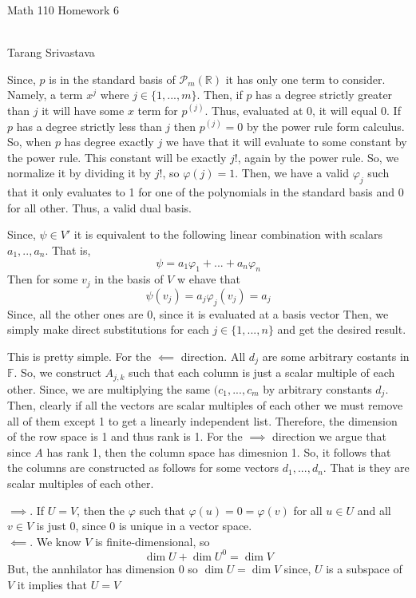 \documentclass[10pt, twocolumn]{article}
\author{Tarang Srivastava}
\newcommand{\R}{\mathbb{R}}
\newcommand{\F}{\mathbb{F}}
\newcommand{\poly}[2]{\mathcal{P}_{#1}\left(#2\right)}
\newcommand{\annhilator}[1]{#1^{0}}
\newcommand{\makechaptertitle}[1]{
\begin{center}
	\begin{large}
		#1
	\end{large}
	\begin{small}
		\\Tarang Srivastava
	\end{small}
\end{center}
}
\begin{document}
	
\makechaptertitle{Math 110 Homework 6}

\begin{q}[7]
    Since, $ p $ is in the standard basis of $ \poly{m}{\R} $ it has only one term to consider.
    Namely, a term $ x^j $ where $ j \in \{1, ..., m\} $. 
    Then, if $ p $ has a degree strictly greater than $ j $ it will have some $ x $ term for $ p^(j) $. 
    Thus, evaluated at 0, it will equal 0. 
    If $ p $ has a degree strictly less than $ j $ then $ p^{(j)} = 0 $ by the power rule form calculus.
    So, when $ p $ has degree exactly $ j $ we have that it will evaluate to some constant by the power rule. 
    This constant will be exactly $ j! $, again by the power rule. 
    So, we normalize it by dividing it by $ j! $, so $ \varphi(j) = 1$. 
    Then, we have a valid $ \varphi_j $ such that it only evaluates to 1 for one of the polynomials in the standard basis and 0 for all other. 
    Thus, a valid dual basis. 
\end{q}
\begin{q}[9]
    Since, $ \psi \in V' $ it is equivalent to the following linear combination with scalars $ a_1, .., a_n $. 
    That is, 
    $$ \psi = a_1 \varphi_1 + ... + a_n \varphi_n $$
    Then for some $ v_j $ in the basis of $ V $ w ehave that 
    $$ \psi(v_j) = a_j \varphi_j(v_j) = a_j $$
    Since, all the other ones are 0, since it is evaluated at a basis vector
    Then, we simply make direct substitutions for each $ j \in \{1, ..., n\} $ and get the desired result.
\end{q}
\begin{q}[11]
    This is pretty simple. 
    For the $ \impliedby $ direction. 
    All $ d_j $ are some arbitrary costants in $ \F $. 
    So, we construct $ A_{j, k} $ such that each column is just a scalar multiple of each other. 
    Since, we are multiplying the same $ (c_1, ..., c_m $ by arbitrary constants $ d_j $. 
    Then, clearly if all the vectors are scalar multiples of each other we must remove all of them except 1 to get a linearly independent list. 
    Therefore, the dimension of the row space is 1 and thus rank is 1. 
    For the $ \implies $ direction we argue that since $ A $ has rank 1, then the column space has dimesnion 1. 
    So, it follows that the columns are constructed as follows for some vectors $ d_1, ..., d_n $. That is they are scalar multiples of each other.
\end{q}
\begin{q}[19]
    $ \implies $. If $ U = V $, then the $ \varphi $ such that $ \varphi(u) = 0 = \varphi(v) $ for all $ u \in U$ and all $ v \in V $ is just 0, since 0 is unique in a vector space. \\
    $ \impliedby $. We know $ V $ is finite-dimensional, so 
    $$ \dim U + \dim \annhilator{U}  = \dim V $$
    But, the annhilator has dimension 0 so 
    $ \dim U = \dim V $
    since,  $ U $ is a subspace of $ V $ it implies that 
    $ U = V $
\end{q}
\end{document}
